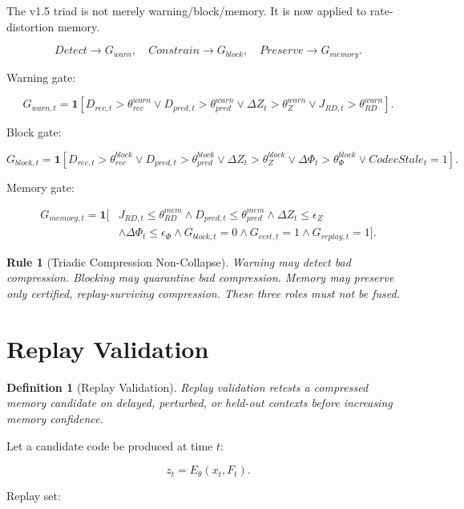 \documentclass[12pt]{article}
\newtheorem{definition}{Definition}
\newtheorem{rulebox}{Rule}
\begin{document}
The v1.5 triad is not merely warning/block/memory. It is now applied to
rate-distortion memory.

\[
Detect\rightarrow G_{warn},\quad Constrain\rightarrow G_{block},\quad Preserve\rightarrow G_{memory}.
\]

Warning gate:

\[
G_{warn,t}=\mathbf{1}
\left[
D_{rec,t}>\theta^{warn}_{rec}
\vee
D_{pred,t}>\theta^{warn}_{pred}
\vee
\Delta Z_t>\theta^{warn}_{Z}
\vee
J_{RD,t}>\theta^{warn}_{RD}
\right].
\]

Block gate:

\[
G_{block,t}=\mathbf{1}
\left[
D_{rec,t}>\theta^{block}_{rec}
\vee
D_{pred,t}>\theta^{block}_{pred}
\vee
\Delta Z_t>\theta^{block}_{Z}
\vee
\Delta\Phi_t>\theta^{block}_{\Phi}
\vee
CodecStale_t=1
\right].
\]

Memory gate:

\[
\boxed{\begin{aligned}
G_{memory,t}=\mathbf{1}[&J_{RD,t}\leq\theta^{mem}_{RD}
\wedge D_{pred,t}\leq\theta^{mem}_{pred}
\wedge \Delta Z_t\leq\epsilon_Z\\
&\wedge \Delta\Phi_t\leq\epsilon_\Phi
\wedge G_{block,t}=0
\wedge G_{cert,t}=1
\wedge G_{replay,t}=1].
\end{aligned}}
\]

\begin{rulebox}[Triadic Compression Non-Collapse]
Warning may detect bad compression. Blocking may quarantine bad compression.
Memory may preserve only certified, replay-surviving compression. These three
roles must not be fused.
\end{rulebox}

\section{Replay Validation}

\begin{definition}[Replay Validation]
Replay validation retests a compressed memory candidate on delayed, perturbed,
or held-out contexts before increasing memory confidence.
\end{definition}

Let a candidate code be produced at time $t$:

\[
z_t=E_\theta(x_t,F_t).
\]

Replay set:
\end{document}
